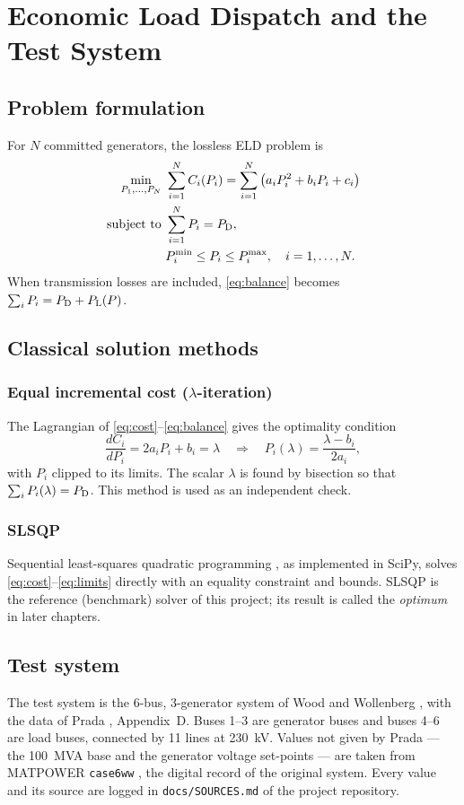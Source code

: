 \chapter{Economic Load Dispatch and the Test System}

\section{Problem formulation}
For $N$ committed generators, the lossless ELD problem is
\begin{align}
\min_{P_1,\dots,P_N}\ & \sum_{i=1}^{N} C_i(P_i) = \sum_{i=1}^{N} \left(a_iP_i^2 + b_iP_i + c_i\right) \label{eq:cost}\\
\text{subject to}\ & \sum_{i=1}^{N} P_i = P_{\mathrm{D}}, \label{eq:balance}\\
& P_i^{\min} \le P_i \le P_i^{\max}, \quad i = 1,\dots,N. \label{eq:limits}
\end{align}
When transmission losses are included, \eqref{eq:balance} becomes $\sum_i P_i = P_{\mathrm{D}} + P_{\mathrm{L}}(P)$.

\section{Classical solution methods}
\subsection{Equal incremental cost ($\lambda$-iteration)}
The Lagrangian of \eqref{eq:cost}--\eqref{eq:balance} gives the optimality condition
\begin{equation}
\frac{dC_i}{dP_i} = 2a_iP_i + b_i = \lambda \quad \Rightarrow \quad P_i(\lambda) = \frac{\lambda - b_i}{2a_i},
\end{equation}
with $P_i$ clipped to its limits. The scalar $\lambda$ is found by bisection so that $\sum_i P_i(\lambda) = P_{\mathrm{D}}$. This method is used as an independent check.

\subsection{SLSQP}
Sequential least-squares quadratic programming \cite{kraft1988}, as implemented in SciPy, solves \eqref{eq:cost}--\eqref{eq:limits} directly with an equality constraint and bounds. SLSQP is the reference (benchmark) solver of this project; its result is called the \emph{optimum} in later chapters.

\section{Test system}
The test system is the 6-bus, 3-generator system of Wood and Wollenberg \cite{wood2014}, with the data of Prada \cite{prada2017}, Appendix~D. Buses 1--3 are generator buses and buses 4--6 are load buses, connected by 11 lines at 230~kV. Values not given by Prada --- the 100~MVA base and the generator voltage set-points --- are taken from MATPOWER \texttt{case6ww} \cite{matpower2011}, the digital record of the original system. Every value and its source are logged in \texttt{docs/SOURCES.md} of the project repository.

